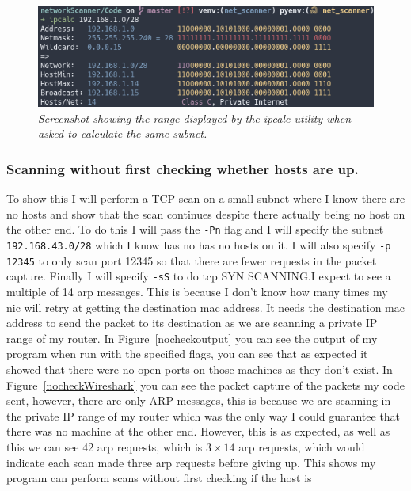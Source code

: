 \documentclass[titlepage]{article}
\let\Oldsubsubsection\subsubsection{}
\renewcommand{\subsubsection}{\FloatBarrier\Oldsubsubsection}
\begin{document}
\begin{figure}[H]
  \centering
  \includegraphics[width=\textwidth]{ipcalclist.png}
  \caption{\textit{%
    Screenshot showing the range displayed by the ipcalc utility when asked to calculate
    the same subnet.
}}\label{cidrwebproof}
\end{figure}

\subsubsection{Scanning without first checking whether hosts are up.}\label{test:nocheck}
To show this I will perform a TCP scan on a small subnet where I
know there are no hosts and show that the scan continues despite there actually
being no host on the other end. To do this I will pass the \verb|-Pn| flag
and I will specify the subnet \verb|192.168.43.0/28| which I know has no has no hosts
on it. I will also specify \verb|-p 12345| to only scan port 12345 so that there are
fewer requests in the packet capture. Finally I will specify \verb|-sS| to do \gls{tcp}
SYN SCANNING.\@ I expect to see a multiple of 14 \gls{arp} messages.
This is because I don't know how many times my \gls{nic} will retry at getting
the destination \gls{mac} address. It needs the destination \gls{mac} address to send
the packet to its destination as we are scanning a private IP range of my router.
In Figure~\ref{nocheckoutput} you can see the output of my program when run with the
specified flags, you can see that as expected it showed that there were no open ports
on those machines as they don't exist. In Figure~\ref{nocheckWireshark} you can see the
packet capture of the packets my code sent, however, there are only ARP messages, this is
because we are scanning in the private IP range of my router which was the only
way I could guarantee that there was no machine at the other end. However, this is
as expected, as well as this we can see 42 \gls{arp} requests, which is $3\times14$
\gls{arp} requests, which would indicate each scan made three \gls{arp} requests before
giving up. This shows my program can perform scans without first checking if the host is
\end{document}
